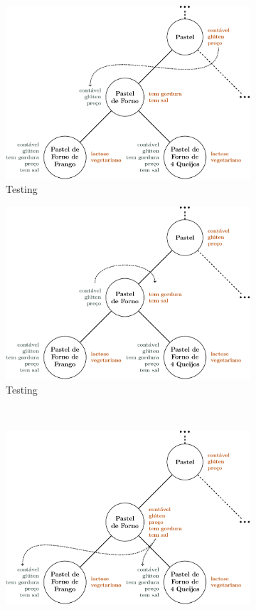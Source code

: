 \documentclass[10pt,a4paper]{article}
\begin{document}
	\begin{figure}
		\caption{Testing}
		\centering
		\begin{subfigure}{0.49\linewidth}
			\includegraphics[width=0.9\linewidth]{../topdown-1.pdf}
			\caption{Testing}
		\end{subfigure}
		\begin{subfigure}{0.49\linewidth}
			\includegraphics[width=0.9\linewidth]{../topdown-2.pdf}
			\caption{Testing}
		\end{subfigure}
		\\
		\begin{subfigure}{0.49\linewidth}
			\includegraphics[width=0.9\linewidth]{../topdown-3.pdf}

\end{subfigure}
\end{figure}
\end{document}

